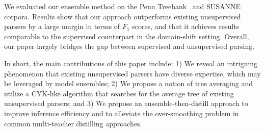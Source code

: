 \documentclass{article}
\begin{document}
We evaluated our ensemble method on the Penn Treebank~\citep[PTB;][]{marcus-etal-1993-building} and SUSANNE~\citep{SusanneCorpus} corpora. Results show that our approach outperforms existing unsupervised parsers by a large margin in terms of $F_1$ scores, and that it achieves results comparable to the supervised counterpart in the domain-shift setting. Overall, our paper largely bridges the gap between supervised and unsupervised parsing.

In short, the main contributions of this paper include: 1) We reveal an intriguing phenomenon that existing unsupervised parsers have diverse expertise, which may be leveraged by model ensembles; 2) We propose a notion of tree averaging and utilize a CYK-like algorithm that searches for the average tree of existing unsupervised parsers; and 3) We propose an ensemble-then-distill approach to improve inference efficiency and to alleviate the over-smoothing problem in common multi-teacher distilling approaches.
\end{document}
